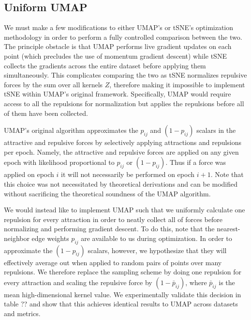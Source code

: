 \documentclass{article}
\theoremstyle{definition}
\begin{document}
\subsection{Uniform UMAP} \label{uniform}
We must make a few modifications to either UMAP's or tSNE's optimization methodology in order to perform a fully controlled comparison between the two. The principle obstacle is that
UMAP performs live gradient updates on each point (which precludes the use of momentum gradient descent) while tSNE collects the gradients across the entire
dataset before applying them simultaneously. This complicates comparing the two as tSNE normalizes repulsive forces by the sum over all kernels $Z$,
therefore making it impossible to implement tSNE within UMAP's original framework. Specifically, UMAP would require access to all the repulsions for
normalization but applies the repulsions before all of them have been collected.

UMAP's original algorithm approximates the $p_{ij}$ and $(1 - p_{ij})$ scalars in the attractive and repulsive forces by selectively applying attractions
and repulsions per epoch. Namely, the attractive and repulsive forces are applied on any given epoch with likelihood proportional to $p_{ij}$
or $(1 - p_{ij})$. Thus if a force was applied on epoch $i$ it will not necessarily be performed on epoch $i+1$. Note that this choice was not necessitated by theoretical derivations
and can be modified without sacrificing the theoretical soundness of the UMAP algorithm.

We would instead like to implement UMAP such that we uniformly calculate one repulsion for every attraction in order to neatly collect all of forces before
normalizing and performing gradient descent. To do this, note that the nearest-neighbor edge weights $p_{ij}$ are available to us during
optimization. In order to approximate the $(1 - p_{ij})$ scalars, however, we hypothesize that they will
effectively average out when applied to random pairs of points over many repulsions. We therefore replace the sampling scheme by doing one repulsion for every attraction and scaling the repulsive force by $(1 - \bar{p}_{ij})$, where
$\bar{p}_{ij}$ is the mean high-dimensional kernel value. We experimentally validate this decision in table ?? and show that this achieves identical results to UMAP across datasets and metrics.
\end{document}
